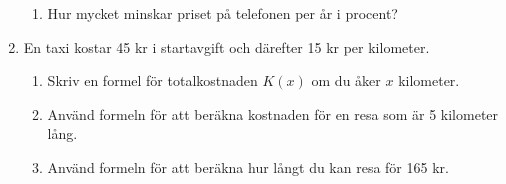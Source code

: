 \documentclass[a4paper,11pt]{article}
\begin{document}
\begin{enumerate}
\begin{enumerate}[label=\alph*)]
      \item Hur mycket minskar priset på telefonen per år i procent?
    \end{enumerate}
    \item En taxi kostar 45 kr i startavgift och därefter 15 kr per kilometer. 
    \begin{enumerate}[label=\alph*)]
      \item Skriv en formel för totalkostnaden $K(x)$ om du åker $x$ kilometer.
      \item Använd formeln för att beräkna kostnaden för en resa som är 5 kilometer lång.
      \item Använd formeln för att beräkna hur långt du kan resa för 165 kr.
    \end{enumerate}
    \end{enumerate}
\end{document}
